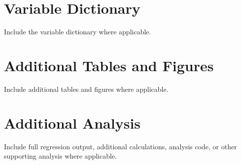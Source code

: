 \documentclass[12pt,a4paper]{article}
\begin{document}
\newpage
\printbibliography[title={References}]

\newpage
\appendix
\section{Variable Dictionary}
Include the variable dictionary where applicable.

\section{Additional Tables and Figures}
Include additional tables and figures where applicable.

\section{Additional Analysis}\label{app:workings}
Include full regression output, additional calculations, analysis code, or other supporting analysis where applicable.
\end{document}
